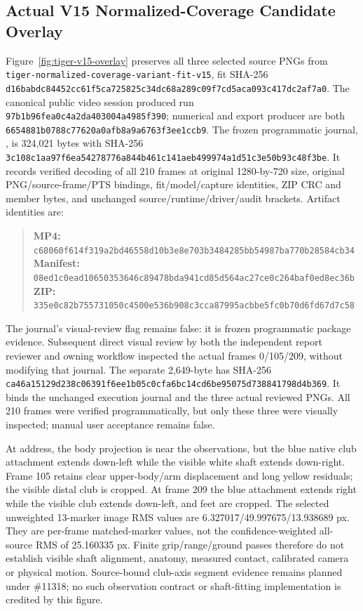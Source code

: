 \documentclass[11pt,letterpaper]{article}
\newcommand{\code}[1]{\nolinkurl{#1}}
\newcommand{\hash}[1]{{\footnotesize\nolinkurl{#1}}}
\begin{document}
\subsection{Actual V15 Normalized-Coverage Candidate Overlay}
Figure~\ref{fig:tiger-v15-overlay} preserves all three selected source PNGs
from \code{tiger-normalized-coverage-variant-fit-v15}, fit SHA-256
\hash{d16babdc84452cc61f5ca725825c34dc68a289c09f7cd5aca093c417dc2af7a0}.
The canonical public video session produced run
\code{97b1b96fea0c4a2da403004a4985f390}; numerical and export producer are both
\code{6654881b0788c77620a0afb8a9a6763f3ee1ccb9}. The frozen programmatic journal,
, is 324,021 bytes with SHA-256
\hash{3c108c1aa97f6ea54278776a844b461c141aeb499974a1d51c3e50b93c48f3be}.
It records verified decoding of all 210 frames at original 1280-by-720 size,
original PNG/source-frame/PTS bindings, fit/model/capture identities, ZIP CRC
and member bytes, and unchanged source/runtime/driver/audit brackets.
Artifact identities are:
\begin{quote}\small
\textbf{MP4:}
\hash{c68060f614f319a2bd46558d10b3e8e703b3484285bb54987ba770b28584cb34}\\
\textbf{Manifest:}
\hash{08ed1c0ead10650353646c89478bda941cd85d564ac27ce0c264baf0ed8ec36b}\\
\textbf{ZIP:}
\hash{335e0c82b755731050c4500e536b908c3cca87995acbbe5fc0b70d6fd67d7c58}
\end{quote}
The journal's visual-review flag remains false: it is frozen programmatic
package evidence. Subsequent direct visual review by both the independent
report reviewer and owning workflow inspected the actual frames 0/105/209,
without modifying that journal. The separate 2,649-byte
 has SHA-256
\hash{ca46a15129d238c06391f6ee1b05c0cfa6bc14cd6be95075d738841798d4b369}.
It binds the unchanged execution journal and the three actual reviewed PNGs.
All 210 frames were verified programmatically, but only these three were
visually inspected; manual user acceptance remains false.

At address, the body projection is near the observations, but the blue native
club attachment extends down-left while the visible white shaft extends
down-right. Frame 105 retains clear upper-body/arm displacement and long yellow
residuals; the visible distal club is cropped. At frame 209 the blue attachment
extends right while the visible club extends down-left, and feet are cropped.
The selected unweighted 13-marker image RMS values are
6.327017/49.997675/13.938689 px. They are per-frame matched-marker values, not
the confidence-weighted all-source RMS of 25.160335 px. Finite grip/range/ground
passes therefore do not establish visible shaft alignment, anatomy, measured
contact, calibrated camera or physical motion. Source-bound club-axis segment
evidence remains planned under \#11318; no such observation contract or
shaft-fitting implementation is credited by this figure.
\end{document}
